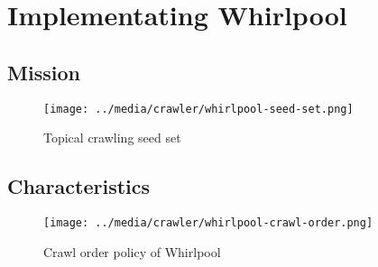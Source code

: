 \chapter{Implementating Whirlpool}\label{implwhirlpool}
\section{Mission}\label{mission}
\begin{figure}[h!]
  \centering
  \texttt{[image: ../media/crawler/whirlpool-seed-set.png]}
  \caption{Topical crawling seed set}
  \label{fig:seedset}
\end{figure}
\section{Characteristics}
\begin{figure}[h!]
  \centering
  \texttt{[image: ../media/crawler/whirlpool-crawl-order.png]}
  \caption{Crawl order policy of Whirlpool}
  \label{fig:whrlplcrawlorder}
\end{figure}

\pagebreak